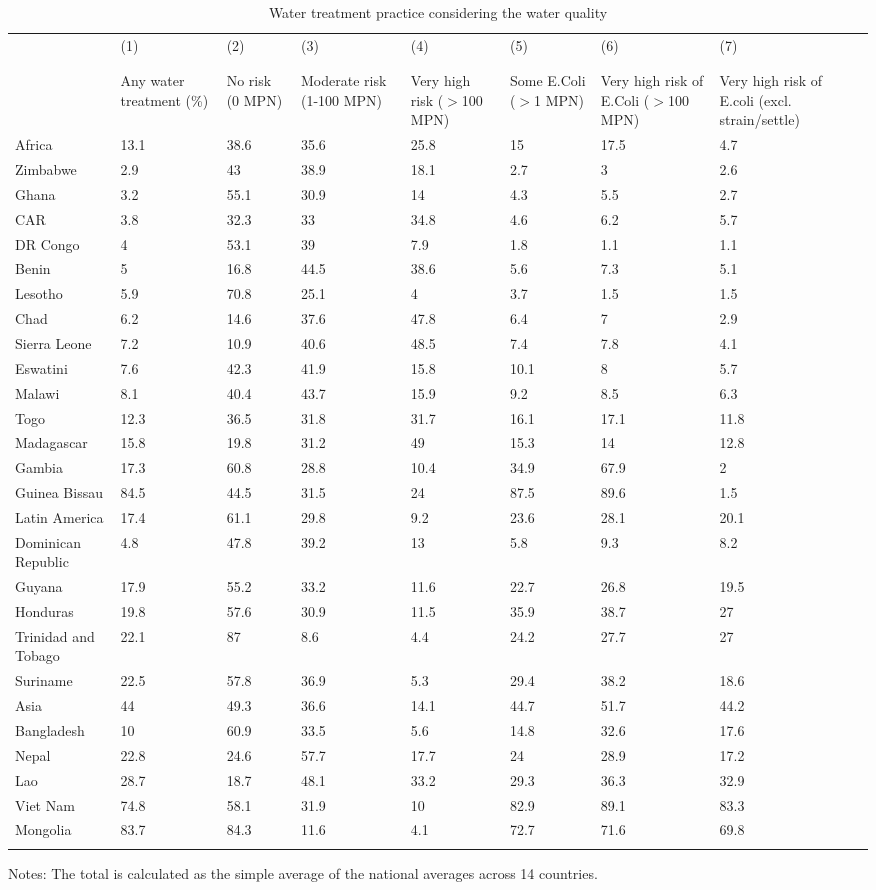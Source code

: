 \begin{table}[htbp] \centering
{}

\caption{Water treatment practice considering the water quality}
\label{TreatRisk}
\begin{tabularx}{\linewidth}{lCCCCCCC}

\toprule
& (1) & (2) & (3) & (4) & (5) & (6) & (7) \\ &&& \\ \cmidrule(lr){3-5} \cmidrule(lr){6-8} \tabularnewline
{}&{Any water treatment (\%)}&{No risk (0 MPN)}&{Moderate risk (1-100 MPN)}&{Very high risk ($>$100 MPN)}&{Some E.Coli ($>$1 MPN)}&{Very high risk of E.Coli ($>$100 MPN)}&{Very high risk of E.coli (excl. strain/settle)} \tabularnewline
\midrule \addlinespace[\belowrulesep]
Africa&13.1&38.6&35.6&25.8&15&17.5&4.7 \tabularnewline
Zimbabwe&2.9&43&38.9&18.1&2.7&3&2.6 \tabularnewline
Ghana&3.2&55.1&30.9&14&4.3&5.5&2.7 \tabularnewline
CAR&3.8&32.3&33&34.8&4.6&6.2&5.7 \tabularnewline
DR Congo&4&53.1&39&7.9&1.8&1.1&1.1 \tabularnewline
Benin&5&16.8&44.5&38.6&5.6&7.3&5.1 \tabularnewline
Lesotho&5.9&70.8&25.1&4&3.7&1.5&1.5 \tabularnewline
Chad&6.2&14.6&37.6&47.8&6.4&7&2.9 \tabularnewline
Sierra Leone&7.2&10.9&40.6&48.5&7.4&7.8&4.1 \tabularnewline
Eswatini&7.6&42.3&41.9&15.8&10.1&8&5.7 \tabularnewline
Malawi&8.1&40.4&43.7&15.9&9.2&8.5&6.3 \tabularnewline
Togo&12.3&36.5&31.8&31.7&16.1&17.1&11.8 \tabularnewline
Madagascar&15.8&19.8&31.2&49&15.3&14&12.8 \tabularnewline
Gambia&17.3&60.8&28.8&10.4&34.9&67.9&2 \tabularnewline
Guinea Bissau&84.5&44.5&31.5&24&87.5&89.6&1.5 \tabularnewline
Latin America&17.4&61.1&29.8&9.2&23.6&28.1&20.1 \tabularnewline
Dominican Republic&4.8&47.8&39.2&13&5.8&9.3&8.2 \tabularnewline
Guyana&17.9&55.2&33.2&11.6&22.7&26.8&19.5 \tabularnewline
Honduras&19.8&57.6&30.9&11.5&35.9&38.7&27 \tabularnewline
Trinidad and Tobago&22.1&87&8.6&4.4&24.2&27.7&27 \tabularnewline
Suriname&22.5&57.8&36.9&5.3&29.4&38.2&18.6 \tabularnewline
Asia&44&49.3&36.6&14.1&44.7&51.7&44.2 \tabularnewline
Bangladesh&10&60.9&33.5&5.6&14.8&32.6&17.6 \tabularnewline
Nepal&22.8&24.6&57.7&17.7&24&28.9&17.2 \tabularnewline
Lao&28.7&18.7&48.1&33.2&29.3&36.3&32.9 \tabularnewline
Viet Nam&74.8&58.1&31.9&10&82.9&89.1&83.3 \tabularnewline
Mongolia&83.7&84.3&11.6&4.1&72.7&71.6&69.8 \tabularnewline
\bottomrule \addlinespace[\belowrulesep]

\end{tabularx}
\begin{flushleft}
\footnotesize Notes: The total is calculated as the simple average of the national averages across 14 countries.
\end{flushleft}
\end{table}
